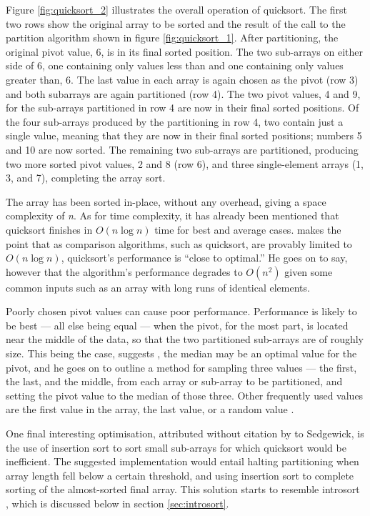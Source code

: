 \documentclass[12pt, a4paper]{article}
\begin{document}
Figure \ref{fig:quicksort_2} illustrates the overall operation of quicksort. The first two rows show the original array to be sorted and the result of the call to the partition algorithm shown in figure \ref{fig:quicksort_1}. After partitioning, the original pivot value, 6, is in its final sorted position. The two sub-arrays on either side of 6, one containing only values less than and one containing only values greater than, 6. The last value in each array is again chosen as the pivot (row 3) and both subarrays are again partitioned (row 4). The two pivot values, 4 and 9, for the sub-arrays partitioned in row 4 are now in their final sorted positions. Of the four sub-arrays produced by the partitioning in row 4, two contain just a single value, meaning that they are now in their final sorted positions; numbers 5 and 10 are now sorted. The remaining two sub-arrays are partitioned, producing two more sorted pivot values, 2 and 8 (row 6), and three single-element arrays (1, 3, and 7), completing the array sort. 

The array has been sorted in-place, without any overhead, giving a space complexity of \emph{n}. As for time complexity, it has already been mentioned that quicksort finishes in $O(n\log n)$ time for best and average cases. \textcite[119]{bentley:pearls} makes the point that as comparison algorithms, such as quicksort, are provably limited to $O(n\log n)$, quicksort's performance is ``close to optimal.''  He goes on to say, however that the algorithm's performance degrades to $O(n^{2})$ given some common inputs such as an array with long runs of identical elements.

Poorly chosen pivot values can cause poor performance. Performance is likely to be best — all else being equal — when the pivot, for the most part, is located near the middle of the data, so that the two partitioned sub-arrays are of roughly size. This being the case, suggests \textcite[851]{Sedgewick-1978}, the median may be an optimal value for the pivot, and he goes on to outline a method for sampling three values — the first, the last, and the middle, from each array or sub-array to be partitioned, and setting the pivot value to the median of those three. Other frequently used values are the first value in the array, the last value, or a random value \autocite[73]{heineman2016algorithms}.

One final interesting optimisation, attributed without citation by \textcite[121]{bentley:pearls} to Sedgewick, is the use of insertion sort to sort small sub-arrays for which quicksort would be inefficient. The suggested implementation would entail halting partitioning when array length fell below a certain threshold, and using insertion sort to complete sorting of the almost-sorted final array. This solution starts to resemble introsort \autocite{musser1997}, which is discussed below in section \ref{sec:introsort}.
\end{document}
